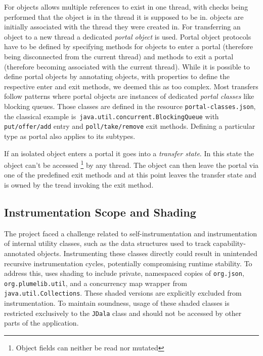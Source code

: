 For \Isolated objects \jdala allows multiple references to exist in one thread, with checks being performed that the object is in the thread it is supposed to be in. \Isolated objects are initially associated with the thread they were created in. For transferring an \Isolated object to a new thread a dedicated \textit{portal object} is used. Portal object protocols have to be defined by specifying methods for objects to enter a portal (therefore being disconnected from the current thread) and methods to exit a portal (therefore becoming associated with the current thread).  While it is possible to define portal objects by annotating objects, with properties to define the respective enter and exit methods, we deemed this  as too complex. Most transfers follow patterns where portal objects are instances of dedicated \textit{portal classes} like blocking queues.  
Those classes are defined in the resource \texttt{portal-classes.json}, the classical example is\texttt{ java.util.concurrent.BlockingQueue} with \texttt{put/\-offer/\-add} entry  and \texttt{poll/\-take/\-remove} exit methods. Defining a particular type as portal also applies to its subtypes. 

If an isolated object enters a portal it goes into a \textit{transfer state}. In this state the object can't be accessed \footnote{Object fields can neither be read nor mutated} by any thread. The object can then leave the portal via one of the predefined exit methods and at this point leaves the transfer state and is owned by the tread invoking the exit method.


\subsection{Instrumentation Scope and Shading}

The \jdala project faced a challenge related to self-instrumentation and instrumentation of internal utility classes, such as the data structures used to track capability-annotated objects. Instrumenting these classes directly could result in unintended recursive instrumentation cycles, potentially compromising runtime stability. To address this, \jdala uses shading to include private, namespaced copies of \texttt{org.json}, \texttt{org.plumelib.util}, and a concurrency map wrapper from \texttt{java.util.Collections}. These shaded versions are explicitly excluded from instrumentation. To maintain soundness, usage of these shaded classes is restricted exclusively to the \texttt{JDala} class and should not be accessed by other parts of the application.

